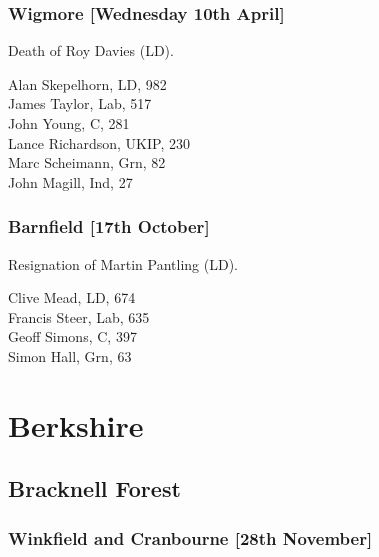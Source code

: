 \documentclass[a4paper,openany,10pt]{book}
\begin{document}
\subsubsection*{Wigmore \hspace*{\fill}\nolinebreak[1]%
\enspace\hspace*{\fill}
[Wednesday 10th April]}


Death of Roy Davies (LD).



Alan Skepelhorn, LD, 982\\
James Taylor, Lab, 517\\
John Young, C, 281\\
Lance Richardson, UKIP, 230\\
Marc Scheimann, Grn, 82\\
John Magill, Ind, 27\\


\subsubsection*{Barnfield \hspace*{\fill}\nolinebreak[1]%
\enspace\hspace*{\fill}
[17th October]}


Resignation of Martin Pantling (LD).



Clive Mead, LD, 674\\
Francis Steer, Lab, 635\\
Geoff Simons, C, 397\\
Simon Hall, Grn, 63\\


\section{Berkshire}

\subsection*{Bracknell Forest}

\subsubsection*{Winkfield and Cranbourne \hspace*{\fill}\nolinebreak[1]%
\enspace\hspace*{\fill}
[28th November]}
\end{document}
